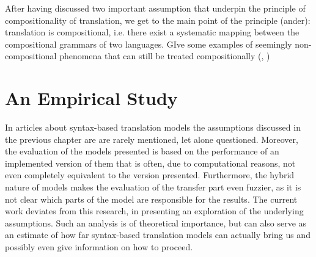 \documentclass{report}
\theoremstyle{definition}
\theoremstyle{plain}
\begin{document}
After having discussed two important assumption that underpin the principle of compositionality of translation, we get to the main point of the principle (ander): translation is compositional, i.e. there exist a systematic mapping between the compositional grammars of two languages.
GIve some examples of seemingly non-compositional phenomena that can still be treated compositionally (\cite{landsbergen1989power}, \cite{rosetta1994compositional})









\chapter{An Empirical Study}


In articles about syntax-based translation models the assumptions discussed in the previous chapter are are rarely mentioned, let alone questioned. Moreover, the evaluation of the models presented is based on the performance of an implemented version of them that is often, due to computational reasons, not even completely equivalent to the version presented. Furthermore, the hybrid nature of models makes the evaluation of the transfer part even fuzzier, as it is not clear which parts of the model are responsible for the results. The current work deviates from this research, in presenting an exploration of the underlying assumptions. Such an analysis is of theoretical importance, but can also serve as an estimate of how far syntax-based translation models can actually bring us and possibly even give information on how to proceed.
\end{document}
